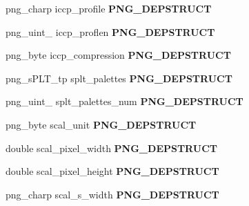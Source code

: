 \begin{DoxyCompactItemize}
\item 
\hypertarget{structpng__info__struct_a0d85668e02491ed5a9b689a9cba90a84}{png\-\_\-charp iccp\-\_\-profile {\bfseries P\-N\-G\-\_\-\-D\-E\-P\-S\-T\-R\-U\-C\-T}}\label{structpng__info__struct_a0d85668e02491ed5a9b689a9cba90a84}

\item 
\hypertarget{structpng__info__struct_a1bb2443414c3316280ffe4494e43ff48}{png\-\_\-uint\-\_ iccp\-\_\-proflen {\bfseries P\-N\-G\-\_\-\-D\-E\-P\-S\-T\-R\-U\-C\-T}}\label{structpng__info__struct_a1bb2443414c3316280ffe4494e43ff48}

\item 
\hypertarget{structpng__info__struct_af67846c07fb819e9690e3da29184dfe7}{png\-\_\-byte iccp\-\_\-compression {\bfseries P\-N\-G\-\_\-\-D\-E\-P\-S\-T\-R\-U\-C\-T}}\label{structpng__info__struct_af67846c07fb819e9690e3da29184dfe7}

\item 
\hypertarget{structpng__info__struct_a575503e2782cf15791d84be8a850735e}{png\-\_\-s\-P\-L\-T\-\_\-tp splt\-\_\-palettes {\bfseries P\-N\-G\-\_\-\-D\-E\-P\-S\-T\-R\-U\-C\-T}}\label{structpng__info__struct_a575503e2782cf15791d84be8a850735e}

\item 
\hypertarget{structpng__info__struct_adad20551d7f3ec033396736469bbcac8}{png\-\_\-uint\-\_ splt\-\_\-palettes\-\_\-num {\bfseries P\-N\-G\-\_\-\-D\-E\-P\-S\-T\-R\-U\-C\-T}}\label{structpng__info__struct_adad20551d7f3ec033396736469bbcac8}

\item 
\hypertarget{structpng__info__struct_a3cf6c5d71a36c0f441fd61f794b5010d}{png\-\_\-byte scal\-\_\-unit {\bfseries P\-N\-G\-\_\-\-D\-E\-P\-S\-T\-R\-U\-C\-T}}\label{structpng__info__struct_a3cf6c5d71a36c0f441fd61f794b5010d}

\item 
\hypertarget{structpng__info__struct_a08a7b61762a1ebab69b1ff9249d5b4fe}{double scal\-\_\-pixel\-\_\-width {\bfseries P\-N\-G\-\_\-\-D\-E\-P\-S\-T\-R\-U\-C\-T}}\label{structpng__info__struct_a08a7b61762a1ebab69b1ff9249d5b4fe}

\item 
\hypertarget{structpng__info__struct_ae0401850bffdccfb52f4bee889527a63}{double scal\-\_\-pixel\-\_\-height {\bfseries P\-N\-G\-\_\-\-D\-E\-P\-S\-T\-R\-U\-C\-T}}\label{structpng__info__struct_ae0401850bffdccfb52f4bee889527a63}

\item 
\hypertarget{structpng__info__struct_abc0879eec3711aa6c9f82f144060622c}{png\-\_\-charp scal\-\_\-s\-\_\-width {\bfseries P\-N\-G\-\_\-\-D\-E\-P\-S\-T\-R\-U\-C\-T}}\label{structpng__info__struct_abc0879eec3711aa6c9f82f144060622c}


\end{DoxyCompactItemize}
